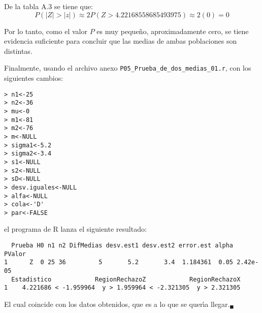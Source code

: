 \begin{solucion}
 \begin{valorp}
  De la tabla A.3 se tiene que:
  \begin{equation*}
   P\left( |Z| > |z| \right) \approx 2P(Z > 4.22168558685493975) \approx 2(0) = 0
  \end{equation*}
 \end{valorp}

 \begin{conclusion}
  Por lo tanto, como el valor $P$ es muy peque\~no, aproximadamente cero, se tiene evidencia suficiente para concluir que las medias de ambas poblaciones son distintas.
 \end{conclusion}
 Finalmente, usando el archivo anexo
 \texttt{P05\_Prueba\_de\_dos\_medias\_01.r},
 con los siguientes cambios:
 \begin{verbatim}
> n1<-25
> n2<-36
> mu<-0
> m1<-81
> m2<-76
> m<-NULL
> sigma1<-5.2
> sigma2<-3.4
> s1<-NULL
> s2<-NULL
> sD<-NULL
> desv.iguales<-NULL
> alfa<-NULL
> cola<-'D'
> par<-FALSE
 \end{verbatim}
 \vspace{-0.5cm}
 el programa de R lanza el siguiente resultado:
 \begin{verbatim}
  Prueba H0 n1 n2 DifMedias desv.est1 desv.est2 error.est alpha   PValor
1      Z  0 25 36         5       5.2       3.4  1.184361  0.05 2.42e-05
  Estadistico            RegionRechazoZ            RegionRechazoX
1    4.221686 < -1.959964  y > 1.959964 < -2.321305  y > 2.321305
 \end{verbatim}
 \vspace{-0.5cm}
 El cual coincide con los datos obtenidos,
 que es a lo que se quer\'{\i}a llegar.${}_{\blacksquare}$
\end{solucion}
